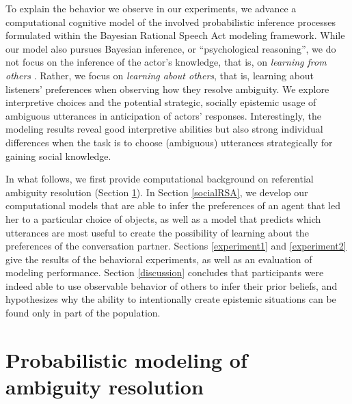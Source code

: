 \documentclass[11pt,a4paper]{article}
\begin{document}
To explain the behavior we observe in our experiments, we advance a computational cognitive model of the involved probabilistic inference processes formulated within the Bayesian Rational Speech Act modeling framework. 
While our model also pursues Bayesian inference, or ``psychological reasoning'', we do not focus on the inference of the actor's knowledge, that is, on \emph{learning from others} \cite{shafto2012learning}.
Rather, we focus on \emph{learning about others}, that is, learning about listeners' preferences when observing how they resolve ambiguity. 
We explore interpretive choices and the potential strategic, socially epistemic usage of ambiguous utterances in anticipation of actors' responses. 
Interestingly, the modeling results reveal good interpretive abilities but also strong individual differences when the task is to choose (ambiguous) utterances strategically for gaining social knowledge. 

In what follows, we first provide computational background on referential ambiguity resolution (Section \ref{modelingTheory}).
In Section \ref{socialRSA}, we develop our computational models that are able to infer the preferences of an agent that led her to a particular choice of objects, as well as a model that predicts which utterances are most useful to create the possibility of learning about the preferences of the conversation partner. 
Sections \ref{experiment1} and \ref{experiment2} give the results of the behavioral experiments, as well as an evaluation of modeling performance. 
Section \ref{discussion} concludes that participants were indeed able to use observable behavior of others to infer their prior beliefs, and hypothesizes why the ability to intentionally create epistemic situations can be found only in part of the population.


\section{Probabilistic modeling of ambiguity resolution} \label{modelingTheory}
\end{document}

